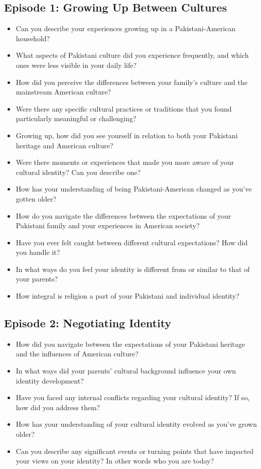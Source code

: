 \subsection{Episode 1: Growing Up Between Cultures}

\begin{itemize}
    \item Can you describe your experiences growing up in a Pakistani-American household?
    \item What aspects of Pakistani culture did you experience frequently, and which ones were less visible in your daily life?
    \item How did you perceive the differences between your family’s culture and the mainstream American culture?
    \item Were there any specific cultural practices or traditions that you found particularly meaningful or challenging?
    \item Growing up, how did you see yourself in relation to both your Pakistani heritage and American culture?
    \item Were there moments or experiences that made you more aware of your cultural identity? Can you describe one?
    \item How has your understanding of being Pakistani-American changed as you've gotten older?
    \item How do you navigate the differences between the expectations of your Pakistani family and your experiences in American society?
    \item Have you ever felt caught between different cultural expectations? How did you handle it?
    \item In what ways do you feel your identity is different from or similar to that of your parents?
    \item How integral is religion a part of your Pakistani and individual identity?
\end{itemize}

\subsection{Episode 2: Negotiating Identity}

\begin{itemize}
    \item How did you navigate between the expectations of your Pakistani heritage and the influences of American culture?
    \item In what ways did your parents’ cultural background influence your own identity development?
    \item Have you faced any internal conflicts regarding your cultural identity? If so, how did you address them?
    \item How has your understanding of your cultural identity evolved as you’ve grown older?
    \item Can you describe any significant events or turning points that have impacted your views on your identity? In other words who you are today?

\end{itemize}

